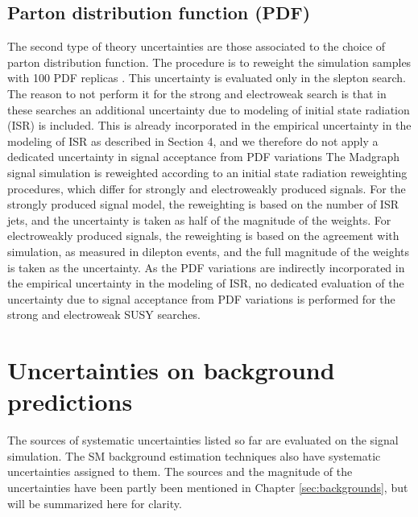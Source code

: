\subsection*{Parton distribution function (PDF)}
\noindent\justify
The second type of theory uncertainties are those associated to the choice of parton distribution function. 
The procedure is to reweight the simulation samples with 100 PDF replicas \cite{Butterworth:2015oua}. This uncertainty is evaluated only in the slepton search. 
The reason to not perform it for the strong and electroweak search is that in these searches an additional uncertainty due to modeling of initial state radiation (ISR) is included. 
This is already incorporated in the empirical
uncertainty in the modeling of ISR as described in Section 4, and we therefore do not apply a
dedicated uncertainty in signal acceptance from PDF variations
The Madgraph signal simulation is reweighted according to an initial state radiation reweighting procedures, which differ for strongly and electroweakly produced signals. 
For the strongly produced signal model, the reweighting is based on the number of ISR jets, and the uncertainty is taken as half of the magnitude of the weights. 
For electroweakly produced signals, the reweighting is based on the \PZ \pt agreement with simulation, as measured in dilepton events, and the full magnitude of the weights is taken as the uncertainty. 
As the PDF variations are indirectly incorporated in the empirical uncertainty in the modeling of ISR, no dedicated evaluation of the uncertainty due to signal acceptance from PDF variations is performed for the strong and electroweak SUSY searches.
\section{Uncertainties on background predictions}
\noindent\justify
The sources of systematic uncertainties listed so far are evaluated on the signal simulation. 
The SM background estimation techniques also have systematic uncertainties assigned to them. 
The sources and the magnitude of the uncertainties have been partly been mentioned in Chapter \ref{sec:backgrounds}, but will be summarized here for clarity. 
